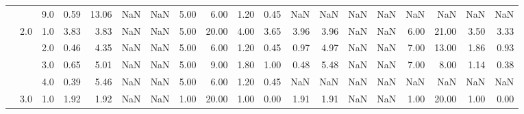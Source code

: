 \begin{tabular}{lllrrrrrrrrrrrrrrrr}
       &     & 9.0  &      0.59 &      13.06 &               NaN &                NaN & 5.00 &   6.00 &             1.20 &                         0.45 &       NaN &        NaN &               NaN &                NaN &  NaN &    NaN &              NaN &                          NaN \\
       & 2.0 & 1.0  &      3.83 &       3.83 &               NaN &                NaN & 5.00 &  20.00 &             4.00 &                         3.65 &      3.96 &       3.96 &               NaN &                NaN & 6.00 &  21.00 &             3.50 &                         3.33 \\
       &     & 2.0  &      0.46 &       4.35 &               NaN &                NaN & 5.00 &   6.00 &             1.20 &                         0.45 &      0.97 &       4.97 &               NaN &                NaN & 7.00 &  13.00 &             1.86 &                         0.93 \\
       &     & 3.0  &      0.65 &       5.01 &               NaN &                NaN & 5.00 &   9.00 &             1.80 &                         1.00 &      0.48 &       5.48 &               NaN &                NaN & 7.00 &   8.00 &             1.14 &                         0.38 \\
       &     & 4.0  &      0.39 &       5.46 &               NaN &                NaN & 5.00 &   6.00 &             1.20 &                         0.45 &       NaN &        NaN &               NaN &                NaN &  NaN &    NaN &              NaN &                          NaN \\
       & 3.0 & 1.0  &      1.92 &       1.92 &               NaN &                NaN & 1.00 &  20.00 &             1.00 &                         0.00 &      1.91 &       1.91 &               NaN &                NaN & 1.00 &  20.00 &             1.00 &                         0.00 \\
\bottomrule
\end{tabular}
